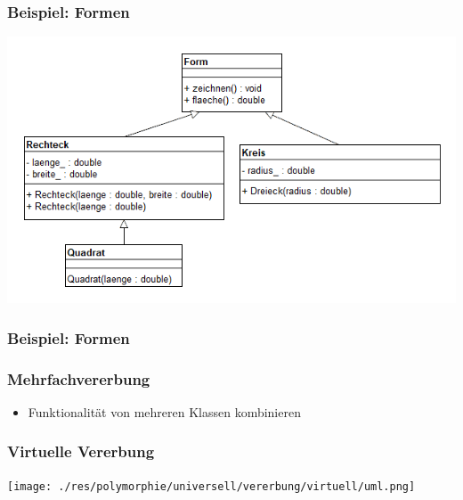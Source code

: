 \documentclass{beamer}
\begin{document}
	{
	\begin{frame}[fragile]
		\frametitle{Beispiel: Formen}
		\includegraphics[width=\textwidth]{./res/polymorphie/universell/vererbung/form/uml.png}
	\end{frame}
	
	{
	\begin{frame}[fragile]
		\frametitle{Beispiel: Formen}
		\UseRawInputEncoding
		\pause{\tiny}
		\pause{\tiny}
		\pause{\tiny}
		\pause{\tiny}
		
	\end{frame}
	}
	
	\begin{frame}
		\frametitle{Mehrfachvererbung}
		\begin{itemize}
			\item Funktionalität von mehreren Klassen kombinieren
		\end{itemize}
	\end{frame}
	
	{
	\begin{frame}[fragile]
		\frametitle{Virtuelle Vererbung}
		\texttt{[image: ./res/polymorphie/universell/vererbung/virtuell/uml.png]}
	\end{frame}
	
}}
\end{document}
